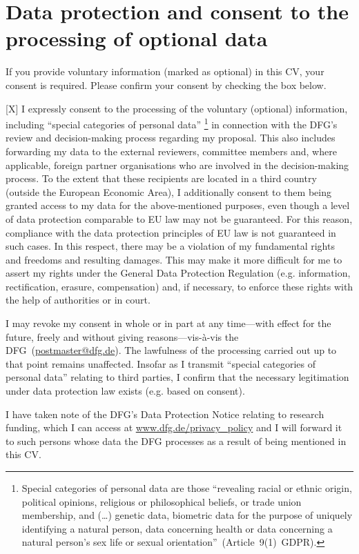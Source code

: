 \documentclass[a4paper,11pt]{article}
\begin{document}


\section*{Data protection and consent to the processing of optional data}

If you provide voluntary information (marked as optional) in this CV, your consent is required. Please confirm your consent by checking the box below.

[X] I expressly consent to the processing of the voluntary (optional) information, including ``special categories of personal data''%
%
\footnote{\scriptsize Special categories of personal data are those ``revealing racial or ethnic origin, political opinions, religious or philosophical beliefs, or trade union membership, and (\dots) genetic data, biometric data for the purpose of uniquely identifying a natural person, data concerning health or data concerning a natural person’s sex life or sexual orientation''~(Article~9(1)~GDPR).}
%
in connection with the DFG’s review and decision-making process regarding my proposal. This also includes forwarding my data to the external reviewers, committee members and, where applicable, foreign partner organisations who are involved in the decision-making process. To the extent that these recipients are located in a third country (outside the European Economic Area), I additionally consent to them being granted access to my data for the above-mentioned purposes, even though a level of data protection comparable to EU law may not be guaranteed. For this reason, compliance with the data protection principles of EU law is not guaranteed in such cases. In this respect, there may be a violation of my fundamental rights and freedoms and resulting damages. This may make it more difficult for me to assert my rights under the General Data Protection Regulation (e.g. information, rectification, erasure, compensation) and, if necessary, to enforce these rights with the help of authorities or in court.

I may revoke my consent in whole or in part at any time---with effect for the future, freely and without giving reasons---vis-à-vis the DFG~(\href{mailto:postmaster@dfg.de}{postmaster@dfg.de}). The lawfulness of the processing carried out up to that point remains unaffected. Insofar as I transmit “special categories of personal data” relating to third parties, I confirm that the necessary legitimation under data protection law exists (e.g. based on consent).

I have taken note of the DFG’s Data Protection Notice relating to research funding, which I can access at \href{www.dfg.de/privacy_policy}{www.dfg.de/privacy\_policy} and I will forward it to such persons whose data the DFG processes as a result of being mentioned in this CV.
\end{document}
